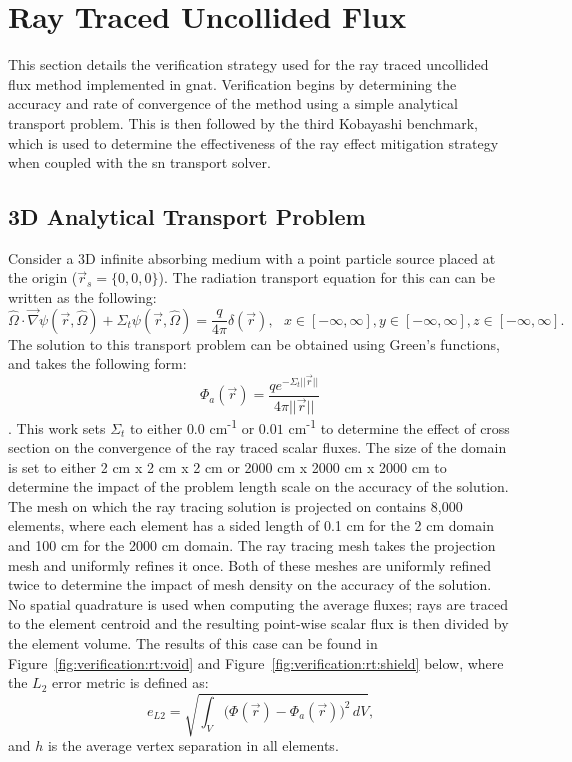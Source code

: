 \section{Ray Traced Uncollided Flux}
\label{verification:radiation_transport_rt}

This section details the verification strategy used for the ray traced uncollided flux method implemented in \acrshort{gnat}. Verification begins by determining the accuracy and rate of convergence of the method using a simple analytical transport problem. This is then followed by the third Kobayashi benchmark, which is used to determine the effectiveness of the ray effect mitigation strategy when coupled with the \acrshort{sn} transport solver.

\subsection{3D Analytical Transport Problem}
\label{verification:radiation_transport_rt:3D_anal}

Consider a 3D infinite absorbing medium with a point particle source placed at the origin ($\vec{r}_{s} = \{0,0,0\}$). The radiation transport equation for this can can be written as the following:
\begin{equation}\label{eq:3D_inf_transport}
    \hat{\Omega}\cdot\vec{\nabla}\psi(\vec{r}, \hat{\Omega}) + \Sigma_{t}\psi(\vec{r},\hat{\Omega}) = \frac{q}{4\pi}\delta(\vec{r}),\,\,\,\,x\in[-\infty, \infty],y\in[-\infty, \infty],z\in[-\infty, \infty]\text{.}
\end{equation}
The solution to this transport problem can be obtained using Green's functions, and takes the following form:
\begin{equation}
    \Phi_{a}(\vec{r}) = \frac{q e^{-\Sigma_{t}||\vec{r}||}}{4\pi ||\vec{r}||}
\end{equation}
\cite{computational_methods}. This work sets $\Sigma_{t}$ to either $0.0$ cm\textsuperscript{-1} or $0.01$ cm\textsuperscript{-1} to determine the effect of cross section on the convergence of the ray traced scalar fluxes. The size of the domain is set to either 2 cm x 2 cm x 2 cm or 2000 cm x 2000 cm x 2000 cm to determine the impact of the problem length scale on the accuracy of the solution. The mesh on which the ray tracing solution is projected on contains 8,000 elements, where each element has a sided length of 0.1 cm for the 2 cm domain and 100 cm for the 2000 cm domain. The ray tracing mesh takes the projection mesh and uniformly refines it once. Both of these meshes are uniformly refined twice to determine the impact of mesh density on the accuracy of the solution. No spatial quadrature is used when computing the average fluxes; rays are traced to the element centroid and the resulting point-wise scalar flux is then divided by the element volume. The results of this case can be found in Figure~\ref{fig:verification:rt:void} and Figure~\ref{fig:verification:rt:shield} below, where the $L_{2}$ error metric is defined as:
\begin{equation}\label{eq:l2_error_rt}
    e_{L2} = \sqrt{\int_{V}\Big(\Phi(\vec{r})- \Phi_{a}(\vec{r})\Big)^{2}\,dV}\text{,}
\end{equation}
and $h$ is the average vertex separation in all elements. 

